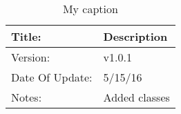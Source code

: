 \begin{table}[]
\centering
\caption{My caption}
\label{my-label}
\begin{tabular}{|l|l|}
\hline
Title:          & Description   \\ \hline
Version:        & v1.0.1        \\ \hline
Date Of Update: & 5/15/16       \\ \hline
Notes:          & Added classes \\ \hline
\end{tabular}
\end{table}

